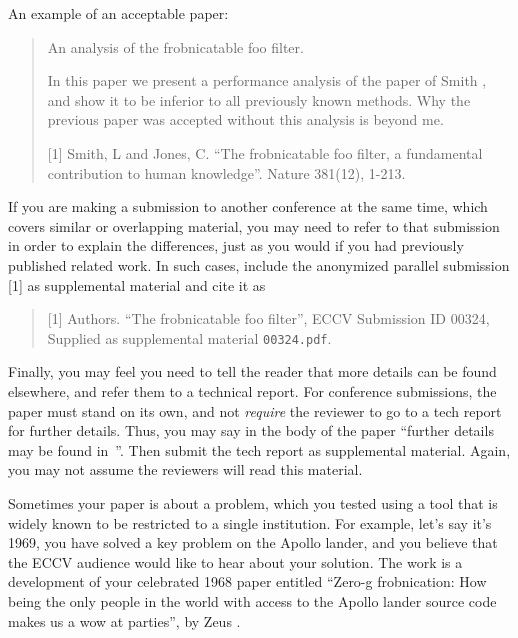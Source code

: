 \documentclass[runningheads]{llncs}
\begin{document}
An example of an acceptable paper:
\begin{quote}
  \begin{center}
     An analysis of the frobnicatable foo filter.
  \end{center}

   In this paper we present a performance analysis of the  paper of Smith \etal [1], and show it to be inferior to all previously known methods.
   Why the previous paper was accepted without this analysis is beyond me.

   [1] Smith, L and Jones, C. ``The frobnicatable foo filter, a fundamental contribution to human knowledge''. Nature 381(12), 1-213.
\end{quote}

If you are making a submission to another conference at the same time, which covers similar or overlapping material, you may need to refer to that submission in order to explain the differences, just as you would if you had previously published related work.
In such cases, include the anonymized parallel submission [1] as supplemental material and cite it as
\begin{quote}
  [1] Authors. ``The frobnicatable foo filter'', ECCV \ECCVyear Submission ID 00324, Supplied as supplemental material {\tt 00324.pdf}.
\end{quote}

Finally, you may feel you need to tell the reader that more details can be found elsewhere, and refer them to a technical report.
For conference submissions, the paper must stand on its own, and not \emph{require} the reviewer to go to a tech report for further details.
Thus, you may say in the body of the paper ``further details may be found in~\cite{Anonymous24b}''.
Then submit the tech report as supplemental material.
Again, you may not assume the reviewers will read this material.

Sometimes your paper is about a problem, which you tested using a tool that is widely known to be restricted to a single institution.
For example, let's say it's 1969, you have solved a key problem on the Apollo lander, and you believe that the ECCV audience would like to hear about your
solution.
The work is a development of your celebrated 1968 paper entitled ``Zero-g frobnication: How being the only people in the world with access to the Apollo lander source code makes us a wow at parties'', by Zeus \etal.
\end{document}
